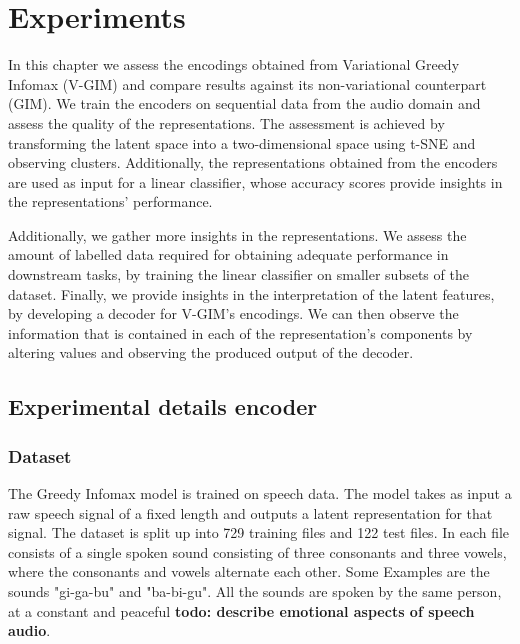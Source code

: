 \chapter{Experiments}

In this chapter we assess the encodings obtained from Variational Greedy Infomax (V-GIM) and compare results against its non-variational counterpart (GIM). We train the encoders on sequential data from the audio domain and assess the quality of the representations. The assessment is achieved by transforming the latent space into a two-dimensional space using t-SNE and observing clusters. Additionally, the representations obtained from the encoders are used as input for a linear classifier, whose accuracy scores provide insights in the representations' performance.

Additionally, we gather more insights in the representations. We assess the amount of labelled data required for obtaining adequate performance in downstream tasks, by training the linear classifier on smaller subsets of the dataset. Finally, we provide insights in the interpretation of the latent features, by developing a decoder for V-GIM's encodings. We can then observe the information that is contained in each of the representation's components by altering values and observing the produced output of the decoder. 


%	

	







\section{Experimental details encoder}

	
	
	\subsection{Dataset}
		The Greedy Infomax model is trained on speech data. The model takes as input a raw speech signal of a fixed length and outputs a latent representation for that signal. The dataset is split up into 729 training files and 122 test files. In each file consists of a single spoken sound consisting of three consonants and three vowels, where the consonants and vowels alternate each other. Some Examples are the sounds "gi-ga-bu" and "ba-bi-gu". All the sounds are spoken by the same person, at a constant and peaceful \textbf{todo: describe emotional aspects of speech audio}. 
		
